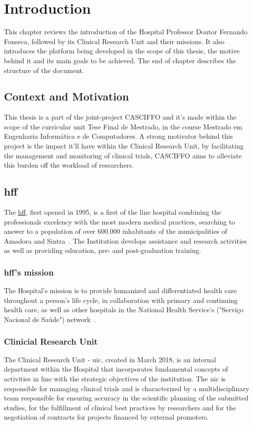 % 
%
\chapter{Introduction}
\label{ch:intro}
This chapter reviews the introduction of the Hospital Professor Doutor Fernando Fonseca, followed by its Clinical Research Unit and their missions. It also introduces the platform being developed in the scope of this thesis, the motive behind it and its main goals to be achieved. The end of chapter describes the structure of the document.

\section{Context and Motivation}
This thesis is a part of the joint-project CASCIFFO and it's made within the scope of the curricular unit Tese Final de Mestrado, in the course Mestrado em Engenharia Informática e de Computadores. A strong motivator behind this project is the impact it'll have within the Clinical Research Unit, by facilitating the management and monitoring of clinical trials, CASCIFFO aims to alleviate this burden off the workload of researchers.

\section{\acrlong{hff}}
\label{ch:intro:sec:intro}

The \href{https://hff.min-saude.pt/}{\acrfull{hff}}, first opened in 1995, is a first of the line hospital combining the professionals excelency with the most modern medical practices, searching to answer to a population of over 600.000 inhabitants of the municipalities of Amadora and Sintra~\cite{hff-intro}. The Institution develops assistance and research activities as well as providing education, pre- and post-graduation training.

\subsection{\acrshort{hff}'s mission}
The Hospital's mission is to provide humanized and differentiated health
care throughout a person's life cycle, in collaboration with primary and
continuing health care, as well as other hospitals in the National
Health Service's ("Serviço Nacional de Saúde") network~\cite{hff-uic}.

\subsection{Clinicial Research Unit}
The Clinical Research Unit - \acrfull{uic}, created in March 2018, is an internal department within the
Hospital that incorporates fundamental concepts of activities in line
with the strategic objectives of the institution. The \acrshort{uic} is responsible
for managing clinical trials and is characterized by a
multidisciplinary team responsible for ensuring accuracy in the
scientific planning of the submitted studies, for the fulfillment of
clinical best practices by researchers and for the negotiation of
contracts for projects financed by external promoters.\\

